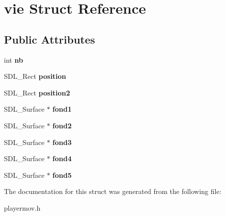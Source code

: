 \hypertarget{structvie}{}\section{vie Struct Reference}
\label{structvie}
\subsection*{Public Attributes}
\begin{DoxyCompactItemize}
\item 
\mbox{\label{structvie_a02356445cb49a7290950ab15cebccdd9}} 
int {\bfseries nb}
\item 
\mbox{\label{structvie_a916050892cf1e7b8039952dcafa44825}} 
S\+D\+L\+\_\+\+Rect {\bfseries position}
\item 
\mbox{\label{structvie_a564dc9c3b28da24d81318d703ebc4e59}} 
S\+D\+L\+\_\+\+Rect {\bfseries position2}
\item 
\mbox{\label{structvie_a7616ae8ecc97b7fb2d92be6a858014ad}} 
S\+D\+L\+\_\+\+Surface $\ast$ {\bfseries fond1}
\item 
\mbox{\label{structvie_a6ecad7f4161cb602faa27d2de9e3ee50}} 
S\+D\+L\+\_\+\+Surface $\ast$ {\bfseries fond2}
\item 
\mbox{\label{structvie_a9763ef794bb12262f5826b911d20e42b}} 
S\+D\+L\+\_\+\+Surface $\ast$ {\bfseries fond3}
\item 
\mbox{\label{structvie_a0b08072b8c7ec9e1adfd6e26b4fcb39f}} 
S\+D\+L\+\_\+\+Surface $\ast$ {\bfseries fond4}
\item 
\mbox{\label{structvie_adabeccdf7e33dd53ac6d85a24fc3931d}} 
S\+D\+L\+\_\+\+Surface $\ast$ {\bfseries fond5}
\end{DoxyCompactItemize}


The documentation for this struct was generated from the following file\+:\begin{DoxyCompactItemize}
\item 
playermov.\+h\end{DoxyCompactItemize}
